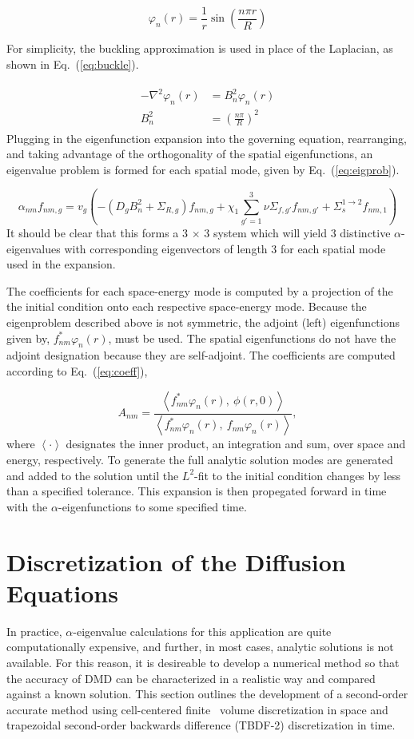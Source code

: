 \documentclass[12pt]{article}
\newcommand{\fn}[1]{\left( #1 \right)}
\newcommand{\ave}[1]{\left\langle #1 \right\rangle}
\newcommand{\bea}{\begin{eqnarray}}
\newcommand{\eea}{\end{eqnarray}}
\newcommand{\be}{\begin{equation}}
\newcommand{\ee}{\end{equation}}
\newcommand{\LEQ}[1]{\label{eq:#1}}
\newcommand{\EQ}[1]{Eq.~(\ref{eq:#1})}
\begin{document}
\be
	\varphi_n(r) = \frac{1}{r} \sin\fn{ \frac{n \pi r}{R} }
	\LEQ{eigfunc}
\ee

For simplicity, the buckling approximation is used in place of the Laplacian, as shown in \EQ{buckle}.

\bea 
	\begin{aligned}
		- \nabla^2 \varphi_n(r) &= B_n^2 \varphi_n(r) \\
	 	B_n^2 &= \fn{ \frac{n \pi}{R} }^2
	\end{aligned} 
	\LEQ{buckle} 
\eea
Plugging in the eigenfunction expansion into the governing equation, rearranging, and taking 
	advantage of the orthogonality of the spatial eigenfunctions, an eigenvalue problem is formed for 
	each spatial mode, given by \EQ{eigprob}.

\be
	\alpha_{nm} f_{nm, g} = v_g \fn{ - \fn{ D_g B_n^2 + \Sigma_{R,g} }f_{nm, g} 
		+ \chi_1 \sum_{g' = 1}^{3} \nu\Sigma_{f,g'} f_{nm, g'} 
		+ \Sigma_s^{1 \rightarrow 2} f_{nm, 1} } 
	\LEQ{eigprob}
\ee
It should be clear that this forms a 3 $\times$ 3 system which will yield 3 distinctive 
	$\alpha$-eigenvalues with corresponding eigenvectors of length 3 for each spatial mode used in the expansion.

The coefficients for each space-energy mode is computed by a projection of the the initial condition 
	onto each respective space-energy mode. 
Because the eigenproblem described above is not symmetric, the adjoint (left) eigenfunctions given by, 
	$f_{nm}^* \varphi_n(r)$, must be used. 
The spatial eigenfunctions do not have the adjoint designation because they are self-adjoint. 
The coefficients are computed according to \EQ{coeff},

\be
	A_{nm} = \frac{\ave{ f_{nm}^* \varphi_n(r), \ \phi(r, 0)}}{\ave{f_{nm}^* 	
			\varphi_n(r), \ f_{nm} \varphi_n(r)}},
	\LEQ{coeff} 
\ee
where $\ave{\cdot}$ designates the inner product, an integration and sum, over space and energy, respectively. 
To generate the full analytic solution modes are generated and added to the solution until the $L^2$-fit 
	to the initial condition changes by less than a specified tolerance. 
This expansion is then propegated forward in time with the $\alpha$-eigenfunctions to some specified time.

\section{Discretization of the Diffusion Equations}
In practice,  $\alpha$-eigenvalue calculations for this application are quite computationally expensive, 
	and  further, in most cases, analytic solutions is not available. 
For this reason, it is desireable to develop a numerical method so that the accuracy of DMD can be 
	characterized in a realistic way and compared against a known solution. 
This section outlines the development of a second-order accurate method using cell-centered finite \	
	volume discretization in space and trapezoidal second-order backwards difference (TBDF-2) discretization in time.
\end{document}

